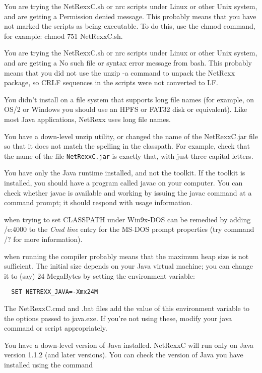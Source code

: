 \begin{description}
\item[Permission Denied] You are trying the NetRexxC.sh or nrc scripts under Linux or other Unix system, and are getting a Permission denied message. This probably means that you have not marked the scripts as being executable. To do this, use the chmod command, for example: chmod 751 NetRexxC.sh.
\item[No such file]  You are trying the NetRexxC.sh or nrc scripts under Linux or other Unix system, and are getting a No such file or syntax error message from bash. This probably means that you did not use the unzip -a command to unpack the NetRexx package, so CRLF sequences in the scripts were not converted to LF.
\item You didn't install on a file system that supports long file names (for example, on OS/2 or Windows you should use an HPFS or FAT32 disk or equivalent). Like most Java applications, NetRexx uses long file names.
\item[Downlevel zip] You have a down-level unzip utility, or changed the name of the NetRexxC.jar file so that it does not match the spelling in the classpath. For example, check that the name of the file \texttt{NetRexxC.jar} is exactly that, with just three capital letters.
\item You have only the Java runtime installed, and not the toolkit. If the toolkit is installed, you should have a program called javac on your computer. You can check whether javac is available and working by issuing the javac command at a command prompt; it should respond with usage information.
\item[out of environment space] when trying to set CLASSPATH under Win9x-DOS can be remedied by adding /e:4000 to the \emph{Cmd line} entry for the MS-DOS prompt properties (try command /? for more information).
\item[java.lang.OutOfMemoryError] when running the compiler probably means that the maximum heap size is not sufficient. The initial size depends on your Java virtual machine; you can change it to (say) 24 MegaBytes by setting the environment variable:
\begin{verbatim}
  SET NETREXX_JAVA=-Xmx24M
\end{verbatim}
The NetRexxC.cmd and .bat files add the value of this environment variable to the options passed to java.exe. If you're not using these, modify your java command or script appropriately.
\item[Down-level Java]  You have a down-level version of Java installed. NetRexxC will run only on Java version 1.1.2 (and later versions). You can check the version of Java you have installed using the command 

\end{description}

